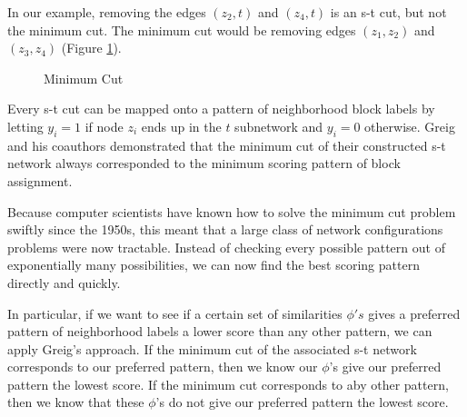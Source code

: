 In our example, removing the edges $(z_2, t)$ and $(z_4, t)$ is an s-t
cut, but not the minimum cut. The minimum cut would be removing edges
$(z_1, z_2)$ and $(z_3, z_4)$ (Figure \ref{fig:mincut}).

\begin{figure}[!h]
\centering

\caption{Minimum Cut}
\label{fig:mincut}
\end{figure}

Every s-t cut can be mapped onto a pattern of neighborhood block
labels by letting $y_i = 1$ if node $z_i$ ends up in the $t$
subnetwork and $y_i = 0$ otherwise. Greig and his coauthors
demonstrated that the minimum cut of their constructed s-t network
always corresponded to the minimum scoring pattern of block
assignment.

Because computer scientists have known how to solve the minimum cut
problem swiftly since the 1950s, this meant that a large class of
network configurations problems were now tractable. Instead of
checking every possible pattern out of exponentially many
possibilities, we can now find the best scoring pattern directly and
quickly.\cite{ford_maximal_1956}

In particular, if we want to see if a certain set of similarities
$\phi's$ gives a preferred pattern of neighborhood labels a lower
score than any other pattern, we can apply Greig's approach. If the
minimum cut of the associated s-t network corresponds to our preferred
pattern, then we know our $\phi$'s give our preferred pattern the
lowest score. If the minimum cut corresponds to aby other pattern,
then we know that these $\phi$'s do not give our preferred pattern the
lowest score.

